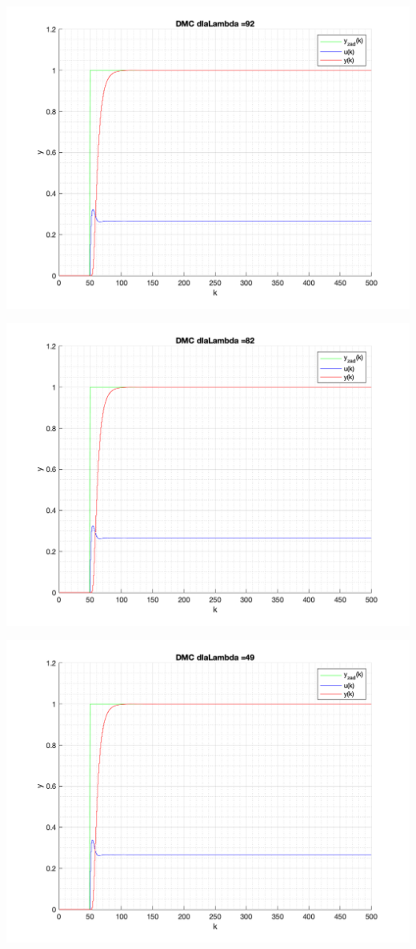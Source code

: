 \documentclass[a4paper, 11pt]{article}
\begin{document}
\begin{enumerate}
 \includegraphics[width=\linewidth]{./ModelsP4_Lambda/P4_DMC_Lambda_92_png.png} 
 
 \includegraphics[width=\linewidth]{./ModelsP4_Lambda/P4_DMC_Lambda_82_png.png} 
 
 \includegraphics[width=\linewidth]{./ModelsP4_Lambda/P4_DMC_Lambda_49_png.png} 
 

\end{enumerate}
\end{document}
